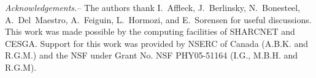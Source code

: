\documentclass[prl,aps,twocolumn,floatfix,amsmath,amssymb,superscriptaddress,tightenlines]{revtex4}
\begin{document}
{\it Acknowledgements.}-- The authors thank I.~Affleck, J.~Berlinsky,
N.~Bonesteel,
A.~Del~Maestro, A.~Feiguin, L.~Hormozi, and E.~Sorensen for useful
discussions.  This work was made possible by the computing facilities of
SHARCNET and CESGA.  Support for this work was provided by NSERC of
Canada (A.B.K. and R.G.M.) and the NSF under Grant No. NSF PHY05-51164 (I.G., M.B.H. and R.G.M).


\end{document}
